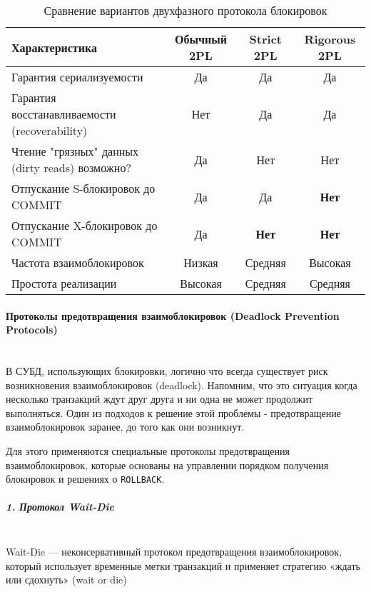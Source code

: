  \begin{table}[H]
     \centering
     \begin{tabular}{|l|c|c|c|}
         \hline
         \textbf{Характеристика} & \textbf{Обычный 2PL} & \textbf{Strict 2PL} & \textbf{Rigorous 2PL} \\
         \hline
         Гарантия сериализуемости & Да & Да & Да \\
         \hline
         Гарантия восстанавливаемости (recoverability) & Нет & Да & Да \\
         \hline
         Чтение "грязных" данных (dirty reads) возможно? & Да & Нет & Нет \\
         \hline
         Отпускание S-блокировок до COMMIT & Да & Да & \textbf{Нет} \\
         \hline
         Отпускание X-блокировок до COMMIT & Да & \textbf{Нет} & \textbf{Нет} \\
         \hline
         Частота взаимоблокировок & Низкая & Средняя & Высокая \\
         \hline
         Простота реализации & Высокая & Средняя & Средняя \\
         \hline
     \end{tabular}
     \caption{Сравнение вариантов двухфазного протокола блокировок}
 \end{table}
 
 \paragraph{Протоколы предотвращения взаимоблокировок (Deadlock Prevention Protocols)} ~\\
 
 В СУБД, использующих блокировки, логично что всегда существует риск возникновения взаимоблокировок (deadlock). Напомним, что это ситуация когда несколько транзакций ждут друг друга и ни одна не может продолжит выполняться. Один из подходов к решение этой проблемы - предотвращение взаимоблокировок заранее, до того как они возникнут.
 
 Для этого применяются специальные протоколы предотвращения взаимоблокировок, которые основаны на управлении порядком получения блокировок и решениях о \texttt{ROLLBACK}. \autocite{Silberschatz, ElmasriNavathe}
 
 \subparagraph{1. Протокол Wait-Die} ~\\
 
 Wait-Die — неконсервативный протокол предотвращения взаимоблокировок, который использует временные метки транзакций и применяет стратегию «ждать или сдохнуть» (wait or die)
 
